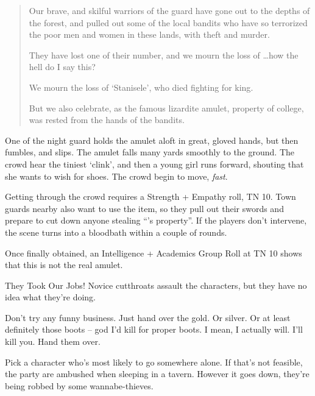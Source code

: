 \begin{multicols}{2}
\begin{boxtext}
\begin{quotation}
    Our brave, and skilful warriors of the \gls{guard} have gone out to the depths of the forest, and pulled out some of the local bandits who have so terrorized the poor men and women in these lands, with theft and murder.

    They have lost one of their number, and we mourn the loss of \ldots how the hell do I say this?

    We mourn the loss of `Stanisele', who died fighting for \gls{king}.

    But we also celebrate, as the famous lizardite amulet, property of \gls{college}, was rested from the hands of the bandits.

  \end{quotation}

  One of the night guard holds the amulet aloft in great, gloved hands, but then fumbles, and slips.  The amulet falls many yards smoothly to the ground.  The crowd hear the tiniest `clink', and then a young girl runs forward, shouting that she wants to wish for shoes.  The crowd begin to move, \emph{fast}.

\end{boxtext}

Getting through the crowd requires a Strength + Empathy roll, TN 10.
Town guards nearby also want to use the item, so they pull out their swords and prepare to cut down anyone stealing ``'s property''.
If the players don't intervene, the scene turns into a bloodbath within a couple of rounds.

Once finally obtained, an Intelligence + Academics Group Roll at TN 10 shows that this is not the real amulet.

{They Took Our Jobs!}%
{Novice cutthroats assault the characters, but they have no idea what they're doing.}%

\begin{speechtext}

  Don't try any funny business.  Just hand over the gold. Or silver.  Or at least definitely those boots -- god I'd kill for proper boots.  I mean, I actually will.  I'll kill you.  Hand them over.

\end{speechtext}

Pick a character who's most likely to go somewhere alone.  If that's not feasible, the party are ambushed when sleeping in a tavern.
However it goes down, they're being robbed by some wannabe-thieves.


\end{multicols}
